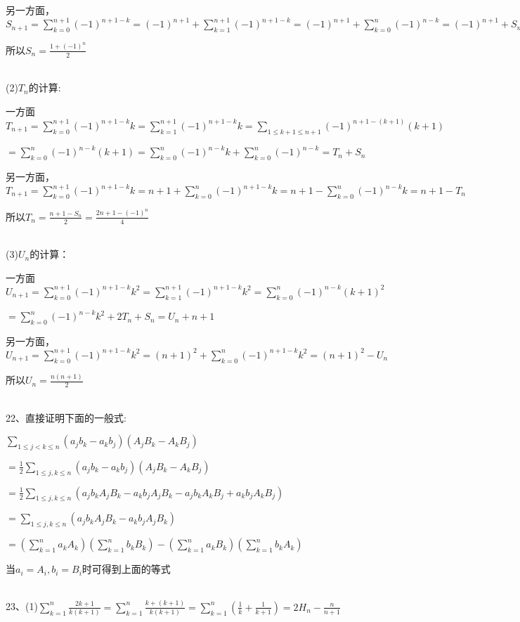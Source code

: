 \documentclass[onecolumn]{article}
\begin{document}
另一方面，$S_{n+1}=\sum_{k=0}^{n+1}(-1)^{n+1-k}=(-1)^{n+1}+\sum_{k=1}^{n+1}(-1)^{n+1-k}=(-1)^{n+1}+\sum_{k=0}^{n}(-1)^{n-k}=(-1)^{n+1}+S_{n}$ \par
所以$S_{n}=\frac{1+(-1)^{n}}{2}$ \par
~\\
(2)$T_{n}$的计算: \par 一方面$T_{n+1}=\sum_{k=0}^{n+1}(-1)^{n+1-k}k=\sum_{k=1}^{n+1}(-1)^{n+1-k}k=\sum_{1\leq k+1\leq n+1}(-1)^{n+1-(k+1)}(k+1)$\par
$=\sum_{k=0}^{n}(-1)^{n-k}(k+1)=\sum_{k=0}^{n}(-1)^{n-k}k+\sum_{k=0}^{n}(-1)^{n-k}=T_{n}+S_{n}$ \par
另一方面，$T_{n+1}=\sum_{k=0}^{n+1}(-1)^{n+1-k}k=n+1+\sum_{k=0}^{n}(-1)^{n+1-k}k=n+1-\sum_{k=0}^{n}(-1)^{n-k}k=n+1-T_{n}$ \par
所以$T_{n}=\frac{n+1-S_{n}}{2}=\frac{2n+1-(-1)^n}{4}$ \par
~\\
(3)$U_{n}$的计算：\par
一方面$U_{n+1}=\sum_{k=0}^{n+1}(-1)^{n+1-k}k^{2}=\sum_{k=1}^{n+1}(-1)^{n+1-k}k^{2}=\sum_{k=0}^{n}(-1)^{n-k}(k+1)^{2}$\par
$=\sum_{k=0}^{n}(-1)^{n-k}k^{2}+2T_{n}+S_{n}=U_{n}+n+1$\par
另一方面，$U_{n+1}=\sum_{k=0}^{n+1}(-1)^{n+1-k}k^{2}=(n+1)^{2}+\sum_{k=0}^{n}(-1)^{n+1-k}k^{2}=(n+1)^{2}-U_{n}$ \par
所以$U_{n}=\frac{n(n+1)}{2}$ \par
~\\
22、直接证明下面的一般式: \par
$\sum_{1\leq j < k \leq n}(a_{j}b_{k}-a_{k}b_{j})(A_{j}B_{k}-A_{k}B_{j})$ \par
$=\frac{1}{2}\sum_{1\leq j,k \leq n}(a_{j}b_{k}-a_{k}b_{j})(A_{j}B_{k}-A_{k}B_{j})$ \par
$=\frac{1}{2}\sum_{1\leq j,k \leq  n}(a_{j}b_{k}A_{j}B_{k}-a_{k}b_{j}A_{j}B_{k}-a_{j}b_{k}A_{k}B_{j}+a_{k}b_{j}A_{k}B_{j})$ \par
$=\sum_{1\leq j,k \leq n}(a_{j}b_{k}A_{j}B_{k}-a_{k}b_{j}A_{j}B_{k})$\par
$=\left (\sum_{k=1}^{n}a_{k}A_{k}  \right )\left (\sum_{k=1}^{n}b_{k}B_{k}  \right )-\left (\sum_{k=1}^{n}a_{k}B_{k}  \right )\left (\sum_{k=1}^{n}b_{k}A_{k}  \right )$\par
当$a_{i}=A_{i},b_{i}=B_{i}$时可得到上面的等式 \par
~\\
23、(1)$\sum_{k=1}^{n}\frac{2k+1}{k(k+1)}=\sum_{k=1}^{n}\frac{k+(k+1)}{k(k+1)}=\sum_{k=1}^{n}(\frac{1}{k}+\frac{1}{k+1})=2H_{n}-\frac{n}{n+1}$ \par
\end{document}

